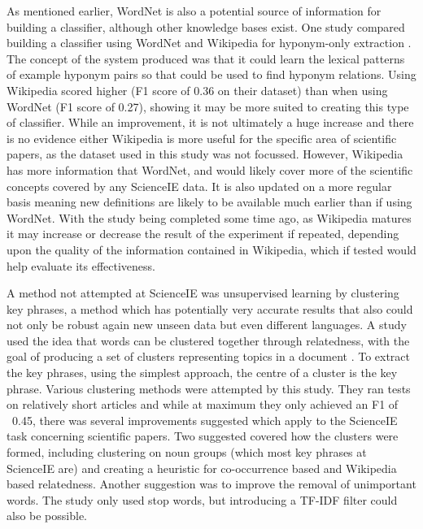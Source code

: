 As mentioned earlier, WordNet is also a potential source of information for building a classifier, although other knowledge bases exist. One study compared building a classifier using WordNet and Wikipedia for hyponym-only extraction \cite{Snow2004}. The concept of the system produced was that it could learn the lexical patterns of example hyponym pairs so that could be used to find hyponym relations. Using Wikipedia scored higher (F1 score of 0.36 on their dataset) than when using WordNet (F1 score of 0.27), showing it may be more suited to creating this type of classifier. While an improvement, it is not ultimately a huge increase and there is no evidence either Wikipedia is more useful for the specific area of scientific papers, as the dataset used in this study was not focussed. However, Wikipedia has more information that WordNet, and would likely cover more of the scientific concepts covered by any ScienceIE data. It is also updated on a more regular basis meaning new definitions are likely to be available much earlier than if using WordNet. With the study being completed some time ago, as Wikipedia matures it may increase or decrease the result of the experiment if repeated, depending upon the quality of the information contained in Wikipedia, which if tested would help evaluate its effectiveness.

A method not attempted at ScienceIE was unsupervised learning by clustering key phrases, a method which has potentially very accurate results that also could not only be robust again new unseen data but even different languages. A study used the idea that words can be clustered together through relatedness, with the goal of producing a set of clusters representing topics in a document \cite{Liu2009}. To extract the key phrases, using the simplest approach, the centre of a cluster is the key phrase. Various clustering methods were attempted by this study. They ran tests on relatively short articles and while at maximum they only achieved an F1 of ~0.45, there was several improvements suggested which apply to the ScienceIE task concerning scientific papers. Two suggested covered how the clusters were formed, including clustering on noun groups (which most key phrases at ScienceIE are) and creating a heuristic for co-occurrence based and Wikipedia based relatedness. Another suggestion was to improve the removal of unimportant words. The study only used stop words, but introducing a TF-IDF filter could also be possible.




